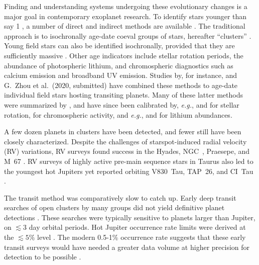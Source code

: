 \documentclass[12pt,twocolumn,tighten]{aastex63}
\begin{document}
Finding and understanding systems undergoing these evolutionary changes is
a major goal in contemporary exoplanet research.  To identify stars
younger than say 1 , a number of direct and indirect methods are
available \citep{soderblom_ages_2010}.  The traditional approach is to
isochronally age-date coeval groups of stars, hereafter ``clusters''
\citep[{\it
e.g.},][]{lada_embedded_2003,zuckerman_young_2004,krumholz_star_2019}.
Young field stars can also be identified isochronally, provided that
they are sufficiently massive \citep{berger_gaia-kepler_2020}.  Other
age indicators include stellar rotation periods, the abundance of
photospheric lithium, and chromospheric diagnostics such as calcium
emission and broadband UV emission.  Studies by, for instance,
\citet{david_discovery_2018} and G{.}~Zhou et al{.}~(2020, submitted)
have combined these methods to age-date individual field stars hosting
transiting planets.  Many of these latter methods were summarized by
\citet{mamajek_improved_2008}, and have since been calibrated by, {\it
e.g.},
\citet{irwin_rotational_2009,barnes_color-period_2015,meibom_spin-down_2015,angus_calibrating_2015}
and \citet{curtis_tess_2019} for stellar rotation,
\citet{zerjal_chromospherically_2017} for chromospheric activity, and
{\it e.g.}, \citet{berger_identifying_2018} and
\citet{zerjal_galah_2019} for lithium abundances.


A few dozen planets in clusters have been detected, and fewer still
have been closely characterized.  Despite the challenges of
starspot-induced radial velocity (RV) variations, RV surveys found
success in the Hyades, NGC~, Praesepe, and M~67
\citep{Sato_et_al_2007,lovis_mayor_2007,Quinn_et_al_2012,Malavolta_et_al_2016,brucalassi_search_2017}.
RV surveys of highly active pre-main sequence stars in Taurus also led
to the youngest hot Jupiters yet reported orbiting V830~Tau, TAP~26,
and CI~Tau
\citep{donati_hj_2016,johns-krull_candidate_2016,yu_hot_2017,biddle_k2_2018,flagg_co_2019}.

The transit method was comparatively slow to catch up.  Early deep
transit searches of open clusters by many groups did not yield
definitive planet detections
\citep{mochejska_planets_2005,mochejska_planets_2006,burke_survey_2006,aigrain_monitor_2007,irwin_monitordata_2007,miller_monitor_2008,pepper_photometric_2008,hartman_MMT_IV_2009}.
These searches were typically sensitive to planets larger than
Jupiter, on $\lesssim 3$ day orbital periods.  Hot Jupiter occurrence
rate limits were derived at the $\lesssim 5\%$ level \citep[{\it
e.g.},][]{burke_survey_2006,hartman_MMT_IV_2009}.  The modern 0.5-1\%
occurrence rate suggests that these early transit surveys would have
needed a greater data volume at higher precision for detection to be
possible
\citep{mayor_harps_2011,wright_frequency_2012,howard_planet_2012,petigura_metallicity_2018}.
\end{document}
